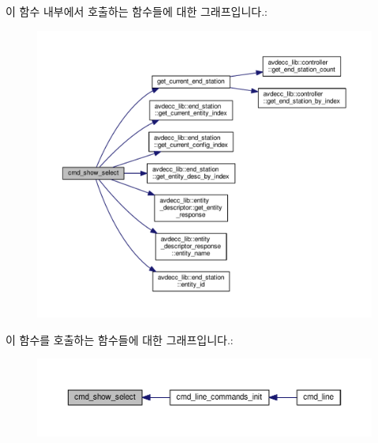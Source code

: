 이 함수 내부에서 호출하는 함수들에 대한 그래프입니다.\+:
\nopagebreak
\begin{figure}[H]
\begin{center}
\leavevmode
\includegraphics[width=350pt]{classcmd__line_ab4568bddc5b3f92bd5b52a5898bc1c52_cgraph}
\end{center}
\end{figure}




이 함수를 호출하는 함수들에 대한 그래프입니다.\+:
\nopagebreak
\begin{figure}[H]
\begin{center}
\leavevmode
\includegraphics[width=350pt]{classcmd__line_ab4568bddc5b3f92bd5b52a5898bc1c52_icgraph}
\end{center}
\end{figure}


